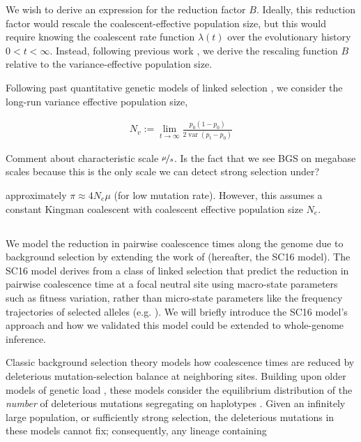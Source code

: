 \documentclass[11pt]{article}
\DeclareMathOperator{\var}{var}
\begin{document}
We wish to derive an expression for the reduction factor $B$. Ideally, this
reduction factor would rescale the coalescent-effective population size, but
this would require knowing the coalescent rate function $\lambda(t)$ over the
evolutionary history $0 < t < \infty$. Instead, following previous work
\parencite{Santiago1995-hx,Santiago1998-bs}, we derive the rescaling function
$B$ relative to the variance-effective population size.

Following past quantitative genetic models of linked selection
\parencite{Robertson1961-ho,Santiago1995-hx,Santiago1998-bs,Santiago2016-mu},
we consider the long-run variance effective population size, 

\begin{align}
  N_v := \lim_{t \to \infty} \frac{p_0(1-p_0)}{2\var\left(p_t - p_0\right)}
\end{align}





Comment about characteristic scale $\nicefrac{\mu}{s}$. Is the fact that we see
BGS on megabase scales because this is the only scale we can detect strong
selection under?


approximately $\pi \approx 4N_e \mu$ (for low mutation rate). However, this
assumes a constant Kingman coalescent with coalescent effective population size
$N_e$. 

\subsection*{}

We model the reduction in pairwise coalescence times along the genome due to
background selection by extending the work of \textcite{Santiago2016-mu}
(hereafter, the SC16 model). The SC16 model derives from a class of linked
selection \parencite{Robertson1961-ho,Santiago1995-hx,Santiago1998-bs} that
predict the reduction in pairwise coalescence time at a focal neutral site
using macro-state parameters such as fitness variation, rather than micro-state
parameters like the frequency trajectories of selected alleles (e.g.
\textcite{Maynard_Smith1974-zr}). We will briefly introduce the SC16 model's
approach and how we validated this model could be extended to whole-genome
inference.

Classic background selection theory models how coalescence times are reduced by
deleterious mutation-selection balance at neighboring sites. Building upon
older models of genetic load \parencite{Crow1970-wj,Kimura1966-bk}, these
models consider the equilibrium distribution of the \emph{number} of
deleterious mutations segregating on haplotypes
\parencite{Charlesworth1993-gb,Nordborg1996-nq}. Given an infinitely large
population, or sufficiently strong selection, the deleterious mutations in
these models cannot fix; consequently, any lineage containing 
\end{document}
